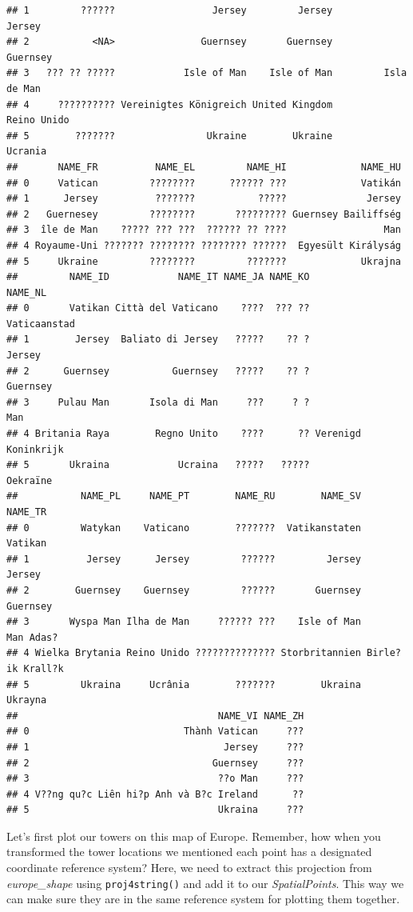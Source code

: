 \documentclass[
]{book}
\begin{document}
\begin{verbatim}
## 1         ??????                 Jersey         Jersey              Jersey
## 2           <NA>               Guernsey       Guernsey            Guernsey
## 3   ??? ?? ?????            Isle of Man    Isle of Man         Isla de Man
## 4     ?????????? Vereinigtes Königreich United Kingdom         Reino Unido
## 5        ???????                Ukraine        Ukraine             Ucrania
##       NAME_FR          NAME_EL         NAME_HI             NAME_HU
## 0     Vatican         ????????      ?????? ???             Vatikán
## 1      Jersey          ???????           ?????              Jersey
## 2   Guernesey         ????????       ????????? Guernsey Bailiffség
## 3  île de Man    ????? ??? ???  ?????? ?? ????                 Man
## 4 Royaume-Uni ??????? ???????? ???????? ??????  Egyesült Királyság
## 5     Ukraine         ????????         ???????             Ukrajna
##         NAME_ID            NAME_IT NAME_JA NAME_KO             NAME_NL
## 0       Vatikan Città del Vaticano    ????  ??? ??        Vaticaanstad
## 1        Jersey  Baliato di Jersey   ?????    ?? ?              Jersey
## 2      Guernsey           Guernsey   ?????    ?? ?            Guernsey
## 3     Pulau Man       Isola di Man     ???     ? ?                 Man
## 4 Britania Raya        Regno Unito    ????      ?? Verenigd Koninkrijk
## 5       Ukraina            Ucraina   ?????   ?????            Oekraïne
##           NAME_PL     NAME_PT        NAME_RU        NAME_SV          NAME_TR
## 0         Watykan    Vaticano        ???????  Vatikanstaten          Vatikan
## 1          Jersey      Jersey         ??????         Jersey           Jersey
## 2        Guernsey    Guernsey         ??????       Guernsey         Guernsey
## 3       Wyspa Man Ilha de Man     ?????? ???    Isle of Man        Man Adas?
## 4 Wielka Brytania Reino Unido ?????????????? Storbritannien Birle?ik Krall?k
## 5         Ukraina     Ucrânia        ???????        Ukraina          Ukrayna
##                                   NAME_VI NAME_ZH
## 0                           Thành Vatican     ???
## 1                                  Jersey     ???
## 2                                Guernsey     ???
## 3                                 ??o Man     ???
## 4 V??ng qu?c Liên hi?p Anh và B?c Ireland      ??
## 5                                 Ukraina     ???
\end{verbatim}

Let's first plot our towers on this map of Europe. Remember, how when you transformed the tower locations we mentioned each point has a designated coordinate reference system? Here, we need to extract this projection from \emph{europe\_shape} using \texttt{proj4string()} and add it to our \emph{SpatialPoints}. This way we can make sure they are in the same reference system for plotting them together.
\end{document}
